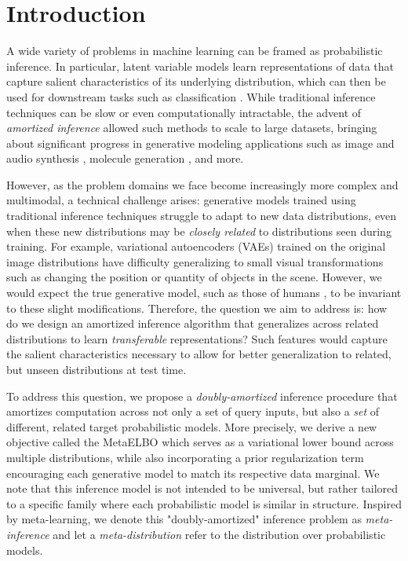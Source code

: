 \section{Introduction}

A wide variety of problems in machine learning can be framed as probabilistic inference. In particular, latent variable models learn representations of data that capture salient characteristics of its underlying distribution, which can then be used for downstream tasks such as classification \cite{klingler2017efficient}. While traditional inference techniques can be slow or even computationally intractable, the advent of \textit{amortized  inference} allowed such methods to scale to large datasets, bringing about significant progress in generative modeling applications such as image and audio synthesis \cite{brock2018large,oord2016wavenet}, molecule generation \cite{segler2017generating}, and more.

However, as the problem domains we face become increasingly more complex and multimodal, a technical challenge arises: generative models trained using traditional inference techniques struggle to adapt to new data distributions, even when these new distributions may be \textit{closely related} to distributions seen during training. For example, variational autoencoders (VAEs) trained on the original image distributions have difficulty generalizing to small visual transformations such as
changing the position or quantity of objects in the scene. 
However, we would expect the true generative model, such as those of humans \cite{yildirim2014perception}, to be invariant to these slight modifications. Therefore, the question we aim to address is: 
how do we design an amortized inference algorithm that 
generalizes across 
related distributions to learn \textit{transferable} representations? Such features would capture the salient characteristics necessary to allow for better generalization to related, but unseen distributions at test time.

To address this question, we propose a \textit{doubly-amortized} inference procedure that amortizes computation across not only a set of query inputs, but also a \textit{set} of different, related target probabilistic models.
More precisely, we derive a new objective called the MetaELBO which serves as a variational lower bound across multiple distributions, while also incorporating a prior regularization term encouraging each generative model to match its respective data marginal.
We note that this inference model is not intended to be universal, but rather tailored to a specific family where each  probabilistic model is similar in structure. 
Inspired by meta-learning, we denote this "doubly-amortized" inference problem as \textit{meta-inference} and let a \textit{meta-distribution} refer to the distribution over probabilistic models. 

